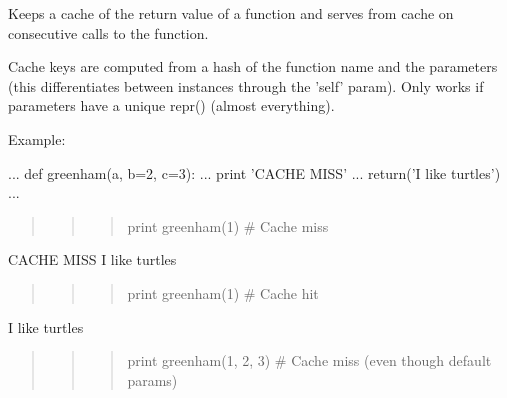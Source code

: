 Keeps a cache of the return value of a function and serves from cache on consecutive calls to the function.

Cache keys are computed from a hash of the function name and the parameters (this differentiates between instances through the 'self' param). Only works if parameters have a unique repr() (almost everything).

Example\-:

\begin{quotation}
\begin{quotation}
\begin{quotation}


\end{quotation}


\end{quotation}


\end{quotation}
... def greenham(a, b=2, c=3)\-: ... print 'C\-A\-C\-H\-E M\-I\-S\-S' ... return('I like turtles') ... \begin{quotation}
\begin{quotation}
\begin{quotation}
print greenham(1) \# Cache miss

\end{quotation}


\end{quotation}


\end{quotation}
C\-A\-C\-H\-E M\-I\-S\-S I like turtles \begin{quotation}
\begin{quotation}
\begin{quotation}
print greenham(1) \# Cache hit

\end{quotation}


\end{quotation}


\end{quotation}
I like turtles \begin{quotation}
\begin{quotation}
\begin{quotation}
print greenham(1, 2, 3) \# Cache miss (even though default params)

\end{quotation}


\end{quotation}


\end{quotation}
